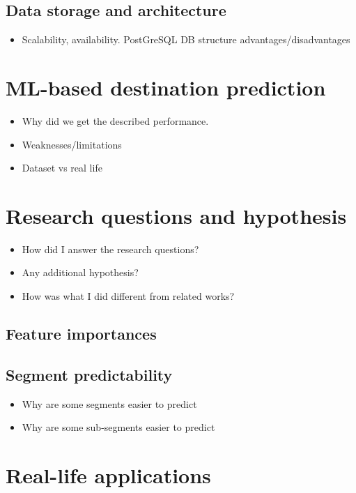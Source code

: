 \subsection{Data storage and architecture}
\begin{itemize}
    \item Scalability, availability. PostGreSQL DB structure advantages/disadvantages
\end{itemize}

\section{ML-based destination prediction}
\begin{itemize}
    \item Why did we get the described performance.
    \item Weaknesses/limitations
    \item Dataset vs real life
\end{itemize}

\section{Research questions and hypothesis}

\begin{itemize}
    \item How did I answer the research questions?
    \item Any additional hypothesis?
    \item How was what I did different from related works?
\end{itemize}

\subsection{Feature importances}

\subsection{Segment predictability}

\begin{itemize}
    \item Why are some segments easier to predict
    \item Why are some sub-segments easier to predict
\end{itemize}

\section{Real-life applications}

